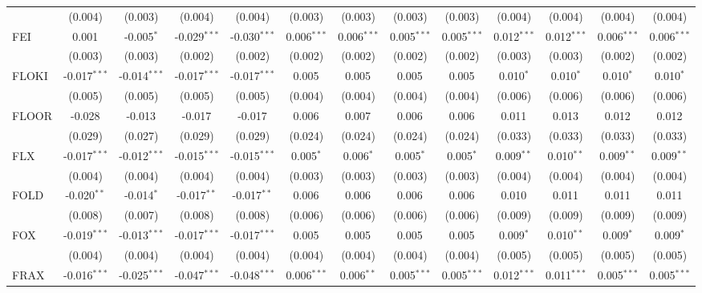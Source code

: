 \begin{table}[!htbp]
\begin{tabular}{@{\extracolsep{5pt}}lcccccccccccc}
  & (0.004) & (0.003) & (0.004) & (0.004) & (0.003) & (0.003) & (0.003) & (0.003) & (0.004) & (0.004) & (0.004) & (0.004) \\
 FEI & 0.001$^{}$ & -0.005$^{*}$ & -0.029$^{***}$ & -0.030$^{***}$ & 0.006$^{***}$ & 0.006$^{***}$ & 0.005$^{***}$ & 0.005$^{***}$ & 0.012$^{***}$ & 0.012$^{***}$ & 0.006$^{***}$ & 0.006$^{***}$ \\
  & (0.003) & (0.003) & (0.002) & (0.002) & (0.002) & (0.002) & (0.002) & (0.002) & (0.003) & (0.003) & (0.002) & (0.002) \\
 FLOKI & -0.017$^{***}$ & -0.014$^{***}$ & -0.017$^{***}$ & -0.017$^{***}$ & 0.005$^{}$ & 0.005$^{}$ & 0.005$^{}$ & 0.005$^{}$ & 0.010$^{*}$ & 0.010$^{*}$ & 0.010$^{*}$ & 0.010$^{*}$ \\
  & (0.005) & (0.005) & (0.005) & (0.005) & (0.004) & (0.004) & (0.004) & (0.004) & (0.006) & (0.006) & (0.006) & (0.006) \\
 FLOOR & -0.028$^{}$ & -0.013$^{}$ & -0.017$^{}$ & -0.017$^{}$ & 0.006$^{}$ & 0.007$^{}$ & 0.006$^{}$ & 0.006$^{}$ & 0.011$^{}$ & 0.013$^{}$ & 0.012$^{}$ & 0.012$^{}$ \\
  & (0.029) & (0.027) & (0.029) & (0.029) & (0.024) & (0.024) & (0.024) & (0.024) & (0.033) & (0.033) & (0.033) & (0.033) \\
 FLX & -0.017$^{***}$ & -0.012$^{***}$ & -0.015$^{***}$ & -0.015$^{***}$ & 0.005$^{*}$ & 0.006$^{*}$ & 0.005$^{*}$ & 0.005$^{*}$ & 0.009$^{**}$ & 0.010$^{**}$ & 0.009$^{**}$ & 0.009$^{**}$ \\
  & (0.004) & (0.004) & (0.004) & (0.004) & (0.003) & (0.003) & (0.003) & (0.003) & (0.004) & (0.004) & (0.004) & (0.004) \\
 FOLD & -0.020$^{**}$ & -0.014$^{*}$ & -0.017$^{**}$ & -0.017$^{**}$ & 0.006$^{}$ & 0.006$^{}$ & 0.006$^{}$ & 0.006$^{}$ & 0.010$^{}$ & 0.011$^{}$ & 0.011$^{}$ & 0.011$^{}$ \\
  & (0.008) & (0.007) & (0.008) & (0.008) & (0.006) & (0.006) & (0.006) & (0.006) & (0.009) & (0.009) & (0.009) & (0.009) \\
 FOX & -0.019$^{***}$ & -0.013$^{***}$ & -0.017$^{***}$ & -0.017$^{***}$ & 0.005$^{}$ & 0.005$^{}$ & 0.005$^{}$ & 0.005$^{}$ & 0.009$^{*}$ & 0.010$^{**}$ & 0.009$^{*}$ & 0.009$^{*}$ \\
  & (0.004) & (0.004) & (0.004) & (0.004) & (0.004) & (0.004) & (0.004) & (0.004) & (0.005) & (0.005) & (0.005) & (0.005) \\
 FRAX & -0.016$^{***}$ & -0.025$^{***}$ & -0.047$^{***}$ & -0.048$^{***}$ & 0.006$^{***}$ & 0.006$^{**}$ & 0.005$^{***}$ & 0.005$^{***}$ & 0.012$^{***}$ & 0.011$^{***}$ & 0.005$^{***}$ & 0.005$^{***}$ \\

\end{tabular}
\end{table}
